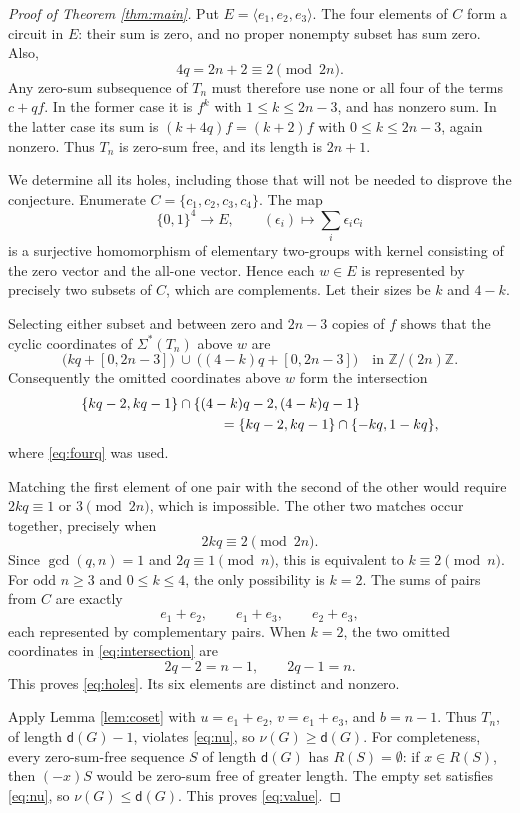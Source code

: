 \documentclass[11pt]{article}
\theoremstyle{definition}
\newcommand{\dd}{\mathsf d}
\begin{document}
\begin{proof}[Proof of Theorem \ref{thm:main}]
Put $E=\langle e_1,e_2,e_3\rangle$. The four elements of $C$ form a circuit in $E$: their sum is zero, and no proper nonempty subset has sum zero. Also,
\begin{equation}\label{eq:fourq}
 4q=2n+2\equiv2\pmod{2n}.
\end{equation}
Any zero-sum subsequence of $T_n$ must therefore use none or all four of the terms $c+qf$. In the former case it is $f^k$ with $1\leq k\leq2n-3$, and has nonzero sum. In the latter case its sum is $(k+4q)f=(k+2)f$ with $0\leq k\leq2n-3$, again nonzero. Thus $T_n$ is zero-sum free, and its length is $2n+1$.

We determine all its holes, including those that will not be needed to disprove the conjecture. Enumerate $C=\{c_1,c_2,c_3,c_4\}$. The map
\[
 \{0,1\}^4\longrightarrow E,\qquad
 (\epsilon_i)\longmapsto\sum_i\epsilon_i c_i
\]
is a surjective homomorphism of elementary two-groups with kernel consisting of the zero vector and the all-one vector. Hence each $w\in E$ is represented by precisely two subsets of $C$, which are complements. Let their sizes be $k$ and $4-k$.

Selecting either subset and between zero and $2n-3$ copies of $f$ shows that the cyclic coordinates of $\Sigma^*(T_n)$ above $w$ are
\[
 \bigl(kq+[0,2n-3]\bigr)\ \cup\
 \bigl((4-k)q+[0,2n-3]\bigr)
 \quad\text{in }\mathbb Z/(2n)\mathbb Z.
\]
Consequently the omitted coordinates above $w$ form the intersection
\begin{align}
 &\{kq-2,kq-1\}\cap\{(4-k)q-2,(4-k)q-1\}\notag\\
 &\hspace{35mm}=\{kq-2,kq-1\}\cap\{-kq,1-kq\},\label{eq:intersection}
\end{align}
where \eqref{eq:fourq} was used.

Matching the first element of one pair with the second of the other would require $2kq\equiv1$ or $3\pmod{2n}$, which is impossible. The other two matches occur together, precisely when
\[
 2kq\equiv2\pmod{2n}.
\]
Since $\gcd(q,n)=1$ and $2q\equiv1\pmod n$, this is equivalent to $k\equiv2\pmod n$. For odd $n\geq3$ and $0\leq k\leq4$, the only possibility is $k=2$. The sums of pairs from $C$ are exactly
\[
 e_1+e_2,\qquad e_1+e_3,\qquad e_2+e_3,
\]
each represented by complementary pairs. When $k=2$, the two omitted coordinates in \eqref{eq:intersection} are
\[
 2q-2=n-1,\qquad 2q-1=n.
\]
This proves \eqref{eq:holes}. Its six elements are distinct and nonzero.

Apply Lemma \ref{lem:coset} with $u=e_1+e_2$, $v=e_1+e_3$, and $b=n-1$. Thus $T_n$, of length $\dd(G)-1$, violates \eqref{eq:nu}, so $\nu(G)\geq\dd(G)$.
For completeness, every zero-sum-free sequence $S$ of length $\dd(G)$ has $R(S)=\emptyset$: if $x\in R(S)$, then $(-x)S$ would be zero-sum free of greater length. The empty set satisfies \eqref{eq:nu}, so $\nu(G)\leq\dd(G)$. This proves \eqref{eq:value}.
\end{proof}
\end{document}
